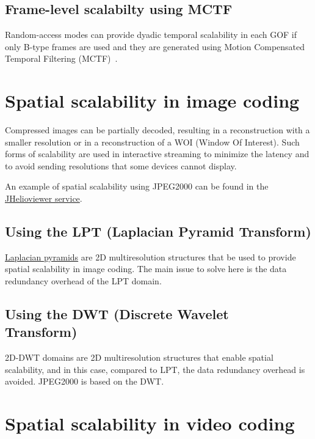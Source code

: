 \subsection{Frame-level scalabilty using MCTF}

Random-access modes can provide dyadic temporal scalability in each
GOF if only B-type frames are used and they are generated using Motion
Compensated Temporal Filtering (MCTF)~\cite{vruiz__MCTF}.


\section{Spatial scalability in image coding}


Compressed images can be partially decoded, resulting in a
reconstruction with a smaller resolution or in a reconstruction of a
WOI (Window Of Interest). Such forms of scalability are used in
interactive streaming to minimize the latency and to avoid sending
resolutions that some devices cannot display.

An example of spatial scalability using JPEG2000 can be found in the
\href{https://www.jhelioviewer.org/}{JHelioviewer service}.

\subsection{Using the LPT (Laplacian Pyramid Transform)}

\href{https://en.wikipedia.org/wiki/Pyramid_(image_processing)#Laplacian_pyramid}{Laplacian
  pyramids} are 2D multiresolution structures that be used to provide
spatial scalability in image coding. The main issue to solve here is
the data redundancy overhead of the LPT domain.

\subsection{Using the DWT (Discrete Wavelet Transform)~\cite{vruiz__JPEG2000}}

2D-DWT domains are 2D multiresolution structures that enable spatial
scalability, and in this case, compared to LPT, the data redundancy
overhead is avoided. JPEG2000 is based on the DWT.


\section{Spatial scalability in video coding~\cite{vruiz__video_scalability}}

